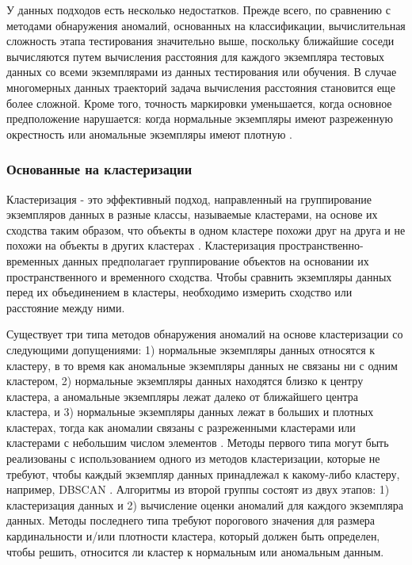 У данных подходов есть несколько недостатков. Прежде всего, по сравнению с методами обнаружения аномалий, основанных на классификации, вычислительная сложность этапа тестирования значительно выше, поскольку ближайшие соседи вычисляются путем вычисления расстояния для каждого экземпляра тестовых данных со всеми экземплярами из данных тестирования или обучения. В случае многомерных данных траекторий задача вычисления расстояния становится еще более сложной. Кроме того, точность маркировки уменьшается, когда основное предположение нарушается: когда нормальные экземпляры имеют разреженную окрестность или аномальные экземпляры имеют плотную \cite{article:15_survey_ad}.

\subsubsection{Основанные на кластеризации}

Кластеризация - это эффективный подход, направленный на группирование экземпляров данных в разные классы, называемые кластерами, на основе их сходства таким образом, что объекты в одном кластере похожи друг на друга и не похожи на объекты в других кластерах \cite{article:8_review_mot_cl_alg}\cite{article:22_survey_dscc}. Кластеризация пространственно-временных данных предполагает группирование объектов на основании их пространственного и временного сходства. Чтобы сравнить экземпляры данных перед их объединением в кластеры, необходимо измерить сходство или расстояние между ними.

Существует три типа методов обнаружения аномалий на основе кластеризации со следующими допущениями: 1) нормальные экземпляры данных относятся к кластеру, в то время как аномальные экземпляры данных не связаны ни с одним кластером, 2) нормальные экземпляры данных находятся близко к центру кластера, а аномальные экземпляры лежат далеко от ближайшего центра кластера, и 3) нормальные экземпляры данных лежат в больших и плотных кластерах, тогда как аномалии связаны с разреженными кластерами или кластерами с небольшим числом элементов \cite{article:15_survey_ad}\cite{article:6_survey_anom_det_rtuvs}. Методы первого типа могут быть реализованы с использованием одного из методов кластеризации, которые не требуют, чтобы каждый экземпляр данных принадлежал к какому-либо кластеру, например, DBSCAN \cite{inproceedings:20_dbscan}. Алгоритмы из второй группы состоят из двух этапов: 1) кластеризация данных и 2) вычисление оценки аномалий для каждого экземпляра данных. Методы последнего типа требуют порогового значения для размера кардинальности и/или плотности кластера, который должен быть определен, чтобы решить, относится ли кластер к нормальным или аномальным данным.

